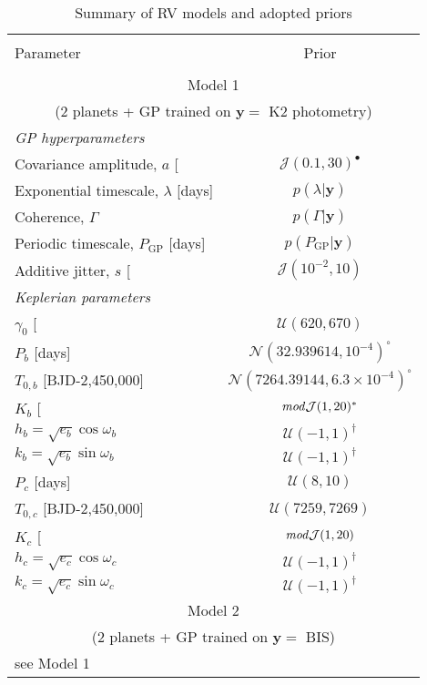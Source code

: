 \begin{table}
\small
\renewcommand{\arraystretch}{0.7}
\centering
\caption{Summary of RV models and adopted priors}
\label{k218table:models}
\begin{tabular}{lc}
\hline \\ [-1ex]
Parameter & Prior \smallskip \\
\hline \\ [-1ex]
\multicolumn{2}{c}{Model 1} \\
\multicolumn{2}{c}{(2 planets + GP trained on $\mathbf{y}=$ K2 photometry)} \smallskip \\
\emph{GP hyperparameters} & \\
Covariance amplitude, $a$ [\mps{]} & $\mathcal{J}(0.1,30)^{\bullet}$ \\
Exponential timescale, $\lambda$ [days] & $p(\lambda|\mathbf{y})$ \\
Coherence, $\Gamma$ &  $p(\Gamma|\mathbf{y})$ \\
Periodic timescale, $P_{\text{GP}}$ [days] &  $p(P_{\text{GP}}|\mathbf{y})$ \\
Additive jitter, $s$ [\mps{]} & $\mathcal{J}(10^{-2},10)$ \smallskip \\ 
\emph{Keplerian parameters} & \\
$\gamma_0$ [\mps{]} & $\mathcal{U}(620,670)$ \\
$P_b$ [days] & $\mathcal{N}(32.939614,10^{-4})^{\circ}$ \\
$T_{0,b}$ [BJD-2,450,000] & $\mathcal{N}(7264.39144,6.3 \times 10^{-4})^{\circ}$ \\
$K_b$ [\mps{]} & $\text{\emph{mod}}\mathcal{J}(1,20)^{\ast}$ \\
$h_b = \sqrt{e_b}\cos{\omega_b}$ & $\mathcal{U}(-1,1)^{\dagger}$ \\
$k_b = \sqrt{e_b}\sin{\omega_b}$ & $\mathcal{U}(-1,1)^{\dagger}$ \\
$P_c$ [days] & $\mathcal{U}(8,10)$ \\
$T_{0,c}$ [BJD-2,450,000] & $\mathcal{U}(7259,7269)$ \\
$K_c$ [\mps{]} & $\text{\emph{mod}}\mathcal{J}(1,20)$ \\
$h_c = \sqrt{e_c}\cos{\omega_c}$ & $\mathcal{U}(-1,1)^{\dagger}$ \\
$k_c = \sqrt{e_c}\sin{\omega_c}$ & $\mathcal{U}(-1,1)^{\dagger}$ \medskip \\

\multicolumn{2}{c}{Model 2} \\
\multicolumn{2}{c}{(2 planets + GP trained on $\mathbf{y}=$ BIS)} \smallskip \\
see Model 1 & \\


\end{tabular}
\end{table}
